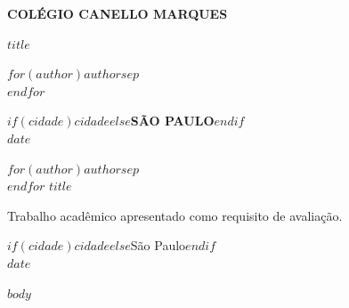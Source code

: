 \documentclass[
  12pt,
  a4paper,
  oneside,
  chapter=TITLE,
  section=TITLE,
  brazil
]{abntex2}
\begin{document}
\pretextual

\begin{capa}
\centering
{\normalfont\bfseries\fontsize{20}{24}\selectfont COLÉGIO CANELLO MARQUES\par}
\vfill
{\normalfont\bfseries\fontsize{20}{24}\selectfont\MakeUppercase{$title$}\par}
\par\vspace{1.5em}
{\normalfont\bfseries\fontsize{16}{20}\selectfont
$for(author)$$author$$sep$ \\ $endfor$\par}
\vfill
{\normalfont\bfseries\fontsize{16}{20}\selectfont
\MakeUppercase{$if(cidade)$$cidade$$else$São Paulo$endif$} \\ $date$\par}
\end{capa}

\begin{folhaderosto}
\centering
{\ABNTEXchapterfont\large
$for(author)$$author$$sep$ \\ $endfor$
}
\vfill
{\ABNTEXchapterfont\bfseries\Large\MakeUppercase{$title$}}
\vfill
\hfill
\begin{minipage}{8cm}
\small
Trabalho acadêmico apresentado como requisito de avaliação.
\end{minipage}
\vfill
{\large $if(cidade)$$cidade$$else$São Paulo$endif$ \\ $date$}
\end{folhaderosto}

\tableofcontents*
\cleardoublepage


\textual
\setcounter{page}{1}
\pagestyle{fancy}

$body$

\postextual

\renewcommand{\bibname}{REFERÊNCIAS}

\printbibliography
\end{document}
